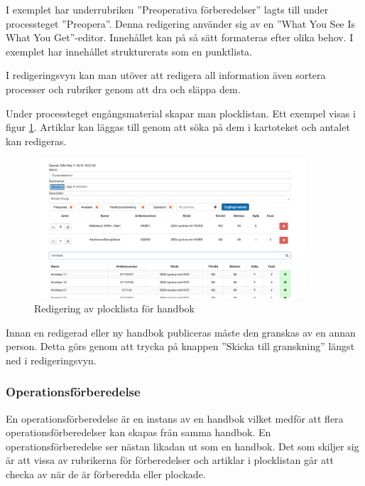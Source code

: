 I exemplet har underrubriken ''Preoperativa förberedelser'' lagts till under processteget ''Preopera''. Denna redigering använder sig av en ''What You See Is What You Get''-editor. Innehållet kan på så sätt formateras efter olika behov. I exemplet har innehållet strukturerats som en punktlista. 

I redigeringsvyn kan man utöver att redigera all information även sortera processer och rubriker genom att dra och släppa dem.

Under processteget engångsmaterial skapar man plocklistan. Ett exempel visas i figur \ref{fig:plocklistaredigering2}. Artiklar kan läggas till genom att söka på dem i kartoteket och antalet kan redigeras.

\begin{figure}[H]
  \centering
  \includegraphics[width=0.9\textwidth]{images/site/plocklistaredigering2}
  \caption{Redigering av plocklista för handbok}
  \label{fig:plocklistaredigering2}
\end{figure}


Innan en redigerad eller ny handbok publiceras måste den granskas av en annan person. Detta görs genom att trycka på knappen ''Skicka till granskning'' längst ned i redigeringsvyn.

\subsubsection{Operationsförberedelse}
En operationsförberedelse är en instans av en handbok vilket medför att flera operations\-förberedelser kan skapas från samma handbok. En operations\-förberedelse ser nästan likadan ut som en handbok.
Det som skiljer sig är att vissa av rubrikerna för förberedelser och artiklar i plocklistan går att checka av när de är förberedda eller plockade.

